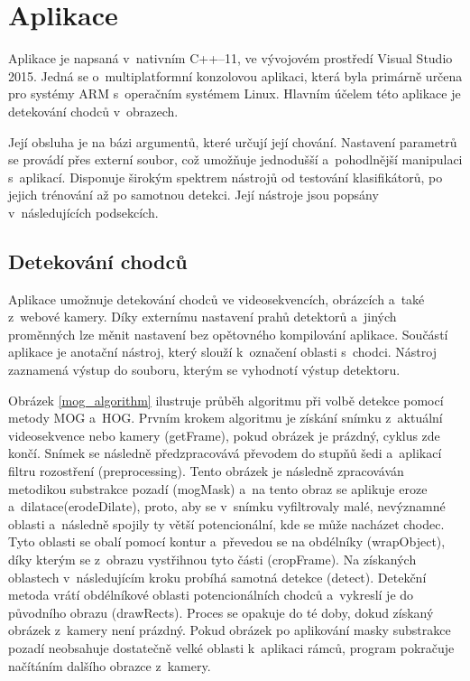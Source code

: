 \section{Aplikace}
Aplikace je napsaná v~nativním C++--11, ve vývojovém prostředí Visual Studio 2015. Jedná se o~multiplatformní konzolovou aplikaci, která byla primárně určena pro systémy ARM s~operačním systémem Linux. Hlavním účelem této aplikace je detekování chodců v~obrazech.

Její obsluha je na bázi argumentů, které určují její chování. Nastavení parametrů se provádí přes externí soubor, což umožňuje jednodušší a~pohodlnější manipulaci s~aplikací. Disponuje širokým spektrem nástrojů od testování klasifikátorů, po jejich trénování až po samotnou detekci. Její nástroje jsou popsány v~následujících podsekcích.

\subsection{Detekování chodců}
Aplikace umožnuje detekování chodců ve videosekvencích, obrázcích a~také z~webové kamery. Díky externímu nastavení prahů detektorů a~jiných proměnných lze měnit nastavení bez opětovného kompilování aplikace. Součástí aplikace je anotační nástroj, který slouží k~označení oblasti s~chodci. Nástroj zaznamená výstup do souboru, kterým se vyhodnotí výstup detektoru.
 
Obrázek \ref{mog_algorithm} ilustruje průběh algoritmu při volbě detekce pomocí metody MOG a~HOG. Prvním krokem algoritmu je získání snímku z~aktuální videosekvence nebo kamery (getFrame), pokud obrázek je prázdný, cyklus zde končí. Snímek se následně předzpracovává převodem do stupňů šedi a~aplikací filtru rozostření (preprocessing). Tento obrázek je následně zpracováván metodikou substrakce pozadí (mogMask) a~na tento obraz se aplikuje eroze a~dilatace(erodeDilate), proto, aby se v~snímku vyfiltrovaly malé, nevýznamné oblasti a~následně spojily ty větší potencionální, kde se může nacházet chodec. Tyto oblasti se obalí pomocí kontur a~převedou se na obdélníky (wrapObject), díky kterým se z~obrazu vystřihnou tyto části (cropFrame). Na získaných oblastech v~následujícím kroku probíhá samotná detekce (detect). Detekční metoda vrátí obdélníkové oblasti potencionálních chodců a~vykreslí je do původního obrazu (drawRects). Proces se opakuje do té doby, dokud získaný obrázek z~kamery není prázdný. Pokud obrázek po aplikování masky substrakce pozadí neobsahuje dostatečně velké oblasti k~aplikaci rámců, program pokračuje načítáním dalšího obrazce z~kamery.  

